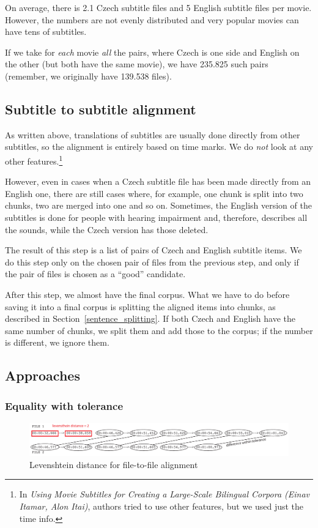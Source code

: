 On average, there is 2.1 Czech subtitle files and 5 English subtitle files per movie. However, the numbers are not evenly distributed and very popular movies can have tens of subtitles.

If we take for \emph{each} movie \emph{all} the pairs, where Czech is one side and English on the other (but both have the same movie), we have 235.825 such pairs (remember, we originally have 139.538 files).

\subsection{Subtitle to subtitle alignment}
As written above, translations of subtitles are usually done directly from other subtitles, so the alignment is entirely based on time marks. We do \emph{not} look at any other features.\footnote{In \emph{Using Movie Subtitles for Creating a Large-Scale Bilingual Corpora (Einav Itamar, Alon Itai)}, authors tried to use other features, but we used just the time info.}

However, even in cases when a Czech subtitle file has been made directly from an English one, there are still cases where, for example, one chunk is split into two chunks, two are merged into one and so on. Sometimes, the English version of the subtitles is done for people with hearing impairment and, therefore, describes all the sounds, while the Czech version has those deleted.

The result of this step is a list of pairs of Czech and English subtitle items. We do this step only on the chosen pair of files from the previous step, and only if the pair of files is chosen as a ``good'' candidate.

After this step, we almost have the final corpus. What we have to do before saving it into a final corpus is splitting the aligned items into chunks, as described in Section~\ref{sentence_splitting}. If both Czech and English have the same number of chunks, we split them and add those to the corpus; if the number is different, we ignore them.


\subsection{Approaches}
\subsubsection{Equality with tolerance}

\begin{figure}[t]
\begin{center}
\includegraphics[width=\textwidth]{figures/tolerance_priklad.pdf}
\end{center}
\caption{Levenshtein distance for file-to-file alignment}\label{tolerance}
\end{figure}


